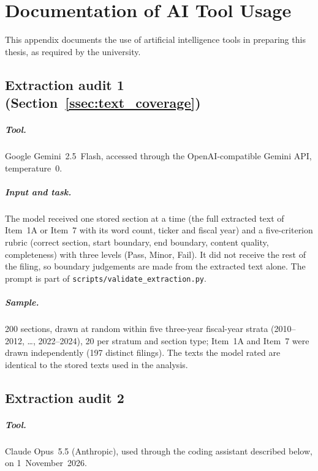 \chapter{Documentation of AI Tool Usage}
\label{app:ai-usage}

This appendix documents the use of artificial intelligence tools in
preparing this thesis, as required by the university.

\section*{Extraction audit 1 (Section~\ref{ssec:text_coverage})}

\paragraph{Tool.} Google Gemini~2.5~Flash, accessed through the
OpenAI-compatible Gemini API, temperature~0.

\paragraph{Input and task.} The model received one stored section at a time
(the full extracted text of Item~1A or Item~7 with its word count, ticker and
fiscal year) and a five-criterion rubric (correct section, start boundary,
end boundary, content quality, completeness) with three levels (Pass, Minor,
Fail). It did not receive the rest of the filing, so boundary judgements are
made from the extracted text alone. The prompt is part of
\texttt{scripts/validate\_extraction.py}.

\paragraph{Sample.} 200 sections, drawn at random within five three-year
fiscal-year strata (2010--2012, \dots, 2022--2024), 20 per stratum and section
type; Item~1A and Item~7 were drawn independently (197 distinct filings).
The texts the model rated are identical to the stored texts used in the
analysis.

\section*{Extraction audit 2}

\paragraph{Tool.} Claude Opus~5.5 (Anthropic), used through the coding
assistant described below, on 1~November~2026.

